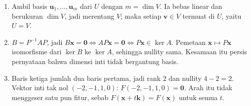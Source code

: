 \begin{enumerate}[label=\textbf{7.\arabic*}]
  \item Ambil basis $\mathbf{u}_{1},\dots,\mathbf{u}_{m}$ dari $U$ dengan
        $m=\dim V$. Ia bebas linear dan berukuran $\dim V$, jadi merentang $V$;
        maka setiap $\mathbf{v}\in V$ termuat di $U$, yaitu $U=V$.

  \item $B=P^{-1}AP$, jadi $B\mathbf{x}=\mathbf{0}\iff AP\mathbf{x}=\mathbf{0}
        \iff P\mathbf{x}\in\ker A$. Pemetaan $\mathbf{x}\mapsto P\mathbf{x}$
        isomorfisme dari $\ker B$ ke $\ker A$, sehingga nullity sama. Kesamaan
        itu persis pernyataan bahwa dimensi inti tidak bergantung basis.

  \item Baris ketiga jumlah dua baris pertama, jadi rank $2$ dan nullity
        $4-2=2$. Vektor inti tak nol $(-2,-1,1,0)$: $F(-2,-1,1,0)=\mathbf{0}$.
        Arah itu tidak menggeser satu pun fitur, sebab
        $F(\mathbf{x}+t\mathbf{k})=F(\mathbf{x})$ untuk semua $t$.
\end{enumerate}

